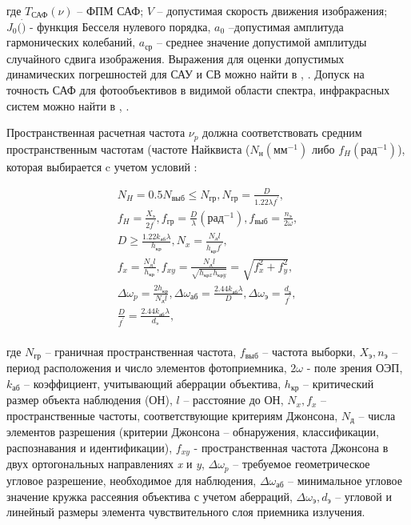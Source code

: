 где $T_{\textit{САФ}}(\nu)$ – ФПМ САФ; 
$V$ – допустимая скорость движения изображения; 
$J_0(\dot)$ - функция Бесселя нулевого порядка, 
$a_0$ –допустимая амплитуда гармонических колебаний, 
$a_{\textit{ср}}$ – среднее значение допустимой амплитуды случайного сдвига изображения. 
Выражения для оценки допустимых динамических погрешностей для САУ и СВ можно найти в \cite[]{Karpov}, \cite[]{Karpov23}. Допуск на точность САФ для фотообъективов в видимой области спектра, инфракрасных систем можно найти в \cite[]{Tarasov}, \cite[]{Belyakov}.

Пространственная расчетная частота $\nu_p$ должна соответствовать средним пространственным частотам (частоте Найквиста ($N_{\textit{н}} (\textit{мм}^{-1})$ либо $f_H (\textit{рад}^{-1})$), которая выбирается c учетом условий \cite[]{Tarasov}: 

\begin{equation}
\label{eq:p2:8}
\begin{alignedat}{2}
N_H=0.5 N_{\textit{выб}}\leq{}N_{\textit{гр}},
N_{\textit{гр}}=\frac{D}{1.22\lambda{}f^{'}},\\
f_H=\frac{X_\textit{э}}{2f^{'}},
f_{\textit{гр}}=\frac{D}{\lambda{}}(\textit{рад}^{-1}),
f_{\textit{выб}}=\frac{n_{\textit{э}}}{2\omega{}},\\
D\geq{}\frac{1.22 k_{\textit{аб}}\lambda{}}{h_{\textit{кр}}},
N_x=\frac{N_{\textit{д}}l}{h_{\textit{кр}}f^{'}},\\
f_x=\frac{N_{\textit{д}}l}{h_{\textit{кр}}},
f_{xy}=\frac{N_{\textit{д}}l}{\sqrt{h_{\textit{крx}}h_{\textit{крy}}}}=\sqrt{f_x^2+f_y^2},\\
\Delta{}{\omega{}}_p=\frac{2h_{\textit{кр}}}{N_{\textit{д}}l},
\Delta{}{\omega{}}_{\textit{аб}} =\frac{2.44 k_{\textit{аб}}\lambda{}}{D},
\Delta{}{\omega{}}_{\textit{э}} =\frac{d_{\textit{э}}}{f^{'}},\\
\frac{D}{f^{'}}=\frac{2.44 k_{\textit{аб}}\lambda{}}{d_{\textit{э}}},\\
\end{alignedat}
\end{equation}

где 
$N_{\textit{гр}}$ – граничная пространственная частота, 
$f_{\textit{выб}}$ – частота выборки, 
$X_{\textit{э}} ,n_{\textit{э}}$ –период расположения и число элементов фотоприемника, 
$2\omega$ - поле зрения ОЭП, 
$k_{\textit{аб}}$ – коэффициент, учитывающий аберрации объектива, 
$h_{\textit{кр}}$ – критический размер объекта наблюдения (ОН), 
$l$ – расстояние до ОН, 
$N_{x} , f_{x}$ – пространственные частоты, соответствующие критериям Джонсона, 
$N_{\textit{д}}$ – числа элементов разрешения (критерии Джонсона – обнаружения, классификации, распознавания и идентификации), 
$f_{xy}$ - пространственная частота Джонсона в двух ортогональных направлениях \textit{x} и \textit{y}, 
$\Delta{}{\omega{}}_p$ – требуемое геометрическое угловое разрешение, необходимое для наблюдения, 
$\Delta{}{\omega{}}_{\textit{аб}}$ – минимальное угловое значение кружка рассеяния объектива с учетом аберраций, 
$\Delta{}{\omega{}}_{\textit{э}} , d_{\textit{э}}$ – угловой и линейный размеры элемента чувствительного слоя приемника излучения. 

